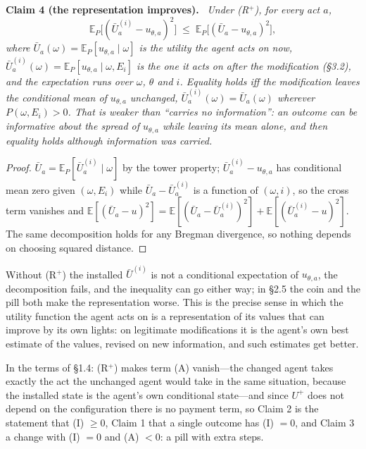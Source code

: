 \documentclass[11pt,a4paper]{article}
\newcommand{\E}{\mathbb{E}}
\newenvironment{stmt}[2]{\par\medskip\noindent\textbf{#1 #2.}\ \itshape\ignorespaces}{\par\medskip}
\begin{document}
\begin{stmt}{Claim}{4 (the representation improves)}
Under (R$^+$), for every act $a$,
\[
\E_P\bigl[(\bar U^{(i)}_a - u_{\theta,a})^2\bigr] \;\le\; \E_P\bigl[(\bar U_a - u_{\theta,a})^2\bigr],
\]
where $\bar U_a(\omega) = \E_P[u_{\theta,a} \mid \omega]$ is the utility the agent acts on now, $\bar U^{(i)}_a(\omega) = \E_P[u_{\theta,a} \mid \omega, E_i]$ is the one it acts on after the modification (\S3.2), and the expectation runs over $\omega$, $\theta$ and $i$. Equality holds iff the modification leaves the conditional mean of $u_{\theta,a}$ unchanged, $\bar U^{(i)}_a(\omega) = \bar U_a(\omega)$ wherever $P(\omega, E_i) > 0$. That is weaker than ``carries no information'': an outcome can be informative about the spread of $u_{\theta,a}$ while leaving its mean alone, and then equality holds although information was carried.
\end{stmt}
\begin{proof}
$\bar U_a = \E_P[\bar U^{(i)}_a \mid \omega]$ by the tower property; $\bar U^{(i)}_a - u_{\theta,a}$ has conditional mean zero given $(\omega, E_i)$ while $\bar U_a - \bar U^{(i)}_a$ is a function of $(\omega, i)$, so the cross term vanishes and $\E[(\bar U_a - u)^2] = \E[(\bar U_a - \bar U^{(i)}_a)^2] + \E[(\bar U^{(i)}_a - u)^2]$. The same decomposition holds for any Bregman divergence, so nothing depends on choosing squared distance.
\end{proof}
Without (R$^+$) the installed $\bar U^{(i)}$ is not a conditional expectation of $u_{\theta,a}$, the decomposition fails, and the inequality can go either way; in \S2.5 the coin and the pill both make the representation worse. This is the precise sense in which the utility function the agent acts on is a representation of its values that can improve by its own lights: on legitimate modifications it is the agent's own best estimate of the values, revised on new information, and such estimates get better.

In the terms of \S1.4: (R$^+$) makes term (A) vanish---the changed agent takes exactly the act the unchanged agent would take in the same situation, because the installed state is the agent's own conditional state---and since $U^+$ does not depend on the configuration there is no payment term, so Claim 2 is the statement that (I) $\ge 0$, Claim 1 that a single outcome has (I) $= 0$, and Claim 3 a change with (I) $= 0$ and (A) $< 0$: a pill with extra steps.
\end{document}

